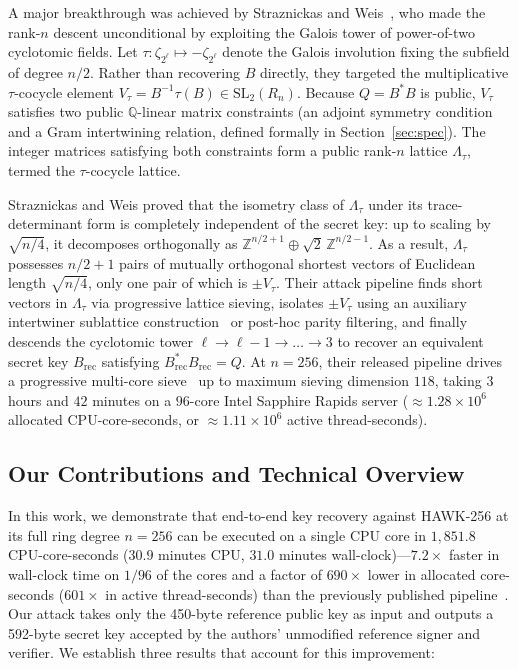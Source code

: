 \documentclass[11pt,a4paper]{article}
\theoremstyle{definition}
\newcommand{\Z}{\mathbb{Z}}
\newcommand{\Q}{\mathbb{Q}}
\newcommand{\Lt}{\Lambda_\tau}
\newcommand{\Vt}{V_\tau}
\begin{document}
A major breakthrough was achieved by Straznickas and Weis~\cite{SW26}, who made the rank-$n$ descent unconditional by exploiting the Galois tower of power-of-two cyclotomic fields. Let $\tau: \zeta_{2^\ell} \mapsto -\zeta_{2^\ell}$ denote the Galois involution fixing the subfield of degree $n/2$. Rather than recovering $B$ directly, they targeted the multiplicative $\tau$-cocycle element $\Vt = B^{-1}\tau(B) \in \mathrm{SL}_2(R_n)$. Because $Q = B^*B$ is public, $\Vt$ satisfies two public $\Q$-linear matrix constraints (an adjoint symmetry condition and a Gram intertwining relation, defined formally in Section~\ref{sec:spec}). The integer matrices satisfying both constraints form a public rank-$n$ lattice $\Lt$, termed the $\tau$-cocycle lattice.

Straznickas and Weis proved that the isometry class of $\Lt$ under its trace-determinant form is completely independent of the secret key: up to scaling by $\sqrt{n/4}$, it decomposes orthogonally as $\Z^{n/2+1} \oplus \sqrt{2}\,\Z^{n/2-1}$. As a result, $\Lt$ possesses $n/2+1$ pairs of mutually orthogonal shortest vectors of Euclidean length $\sqrt{n/4}$, only one pair of which is $\pm \Vt$. Their attack pipeline finds short vectors in $\Lt$ via progressive lattice sieving, isolates $\pm \Vt$ using an auxiliary intertwiner sublattice construction~\cite[Remark~6.2]{SW26} or post-hoc parity filtering, and finally descends the cyclotomic tower $\ell \to \ell-1 \to \dots \to 3$ to recover an equivalent secret key $B_{\mathrm{rec}}$ satisfying $B_{\mathrm{rec}}^* B_{\mathrm{rec}} = Q$. At $n=256$, their released pipeline drives a progressive multi-core sieve~\cite{ZDY25} up to maximum sieving dimension $118$, taking $3$ hours and $42$ minutes on a $96$-core Intel Sapphire Rapids server ($\approx 1.28 \times 10^6$ allocated CPU-core-seconds, or $\approx 1.11 \times 10^6$ active thread-seconds).

\subsection{Our Contributions and Technical Overview}
In this work, we demonstrate that end-to-end key recovery against HAWK-256 at its full ring degree $n=256$ can be executed on a single CPU core in $1{,}851.8$ CPU-core-seconds ($30.9$ minutes CPU, $31.0$ minutes wall-clock)---$7.2\times$ faster in wall-clock time on $1/96$ of the cores and a factor of $690\times$ lower in allocated core-seconds ($601\times$ in active thread-seconds) than the previously published pipeline~\cite{SW26}. Our attack takes only the 450-byte reference public key as input and outputs a 592-byte secret key accepted by the authors' unmodified reference signer and verifier. We establish three results that account for this improvement:
\end{document}
